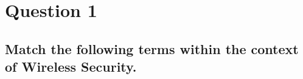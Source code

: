 \documentclass{report}
\begin{document}
	\section{Question 1}
	\startsection
		\renewcommand{\thesubsection}{\thesection.\Alph{subsection}}
		\subsection{Match the following terms within the context of Wireless Security.}
		\startsubsection
		\closesection
	\closesection
\end{document}
